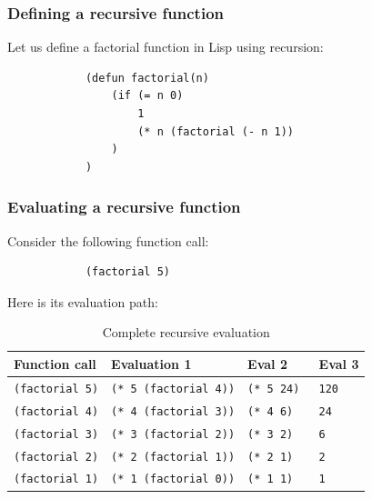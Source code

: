 \documentclass{beamer}
\begin{document}
\begin{frame}[fragile]
	\frametitle{Defining a recursive function}
		Let us define a factorial function in Lisp using recursion:
		\begin{example}
			\begin{verbatim}
			(defun factorial(n)
				(if (= n 0)
					1
					(* n (factorial (- n 1))
				)
			)
			\end{verbatim}
		\end{example}
		
\end{frame}

\begin{frame}[fragile]
	\frametitle{Evaluating a recursive function}
	\begin{table}
		Consider the following function call:
		\begin{example}
			\begin{verbatim}
			(factorial 5)
			\end{verbatim}
		\end{example}
		
		Here is its evaluation path:
		\begin{tabular}{l l l l}
			\toprule
			\textbf{Function call} & \textbf{Evaluation 1} & \textbf{Eval 2} & \textbf{Eval 3}\\
			\midrule
			\texttt{(factorial 5)} &\texttt{(* 5 (factorial 4))} & \texttt{(* 5 24) } & \texttt{120} \\
			\texttt{(factorial 4)} &\texttt{(* 4 (factorial 3))} & \texttt{(* 4 6)  } & \texttt{24} \\
			\texttt{(factorial 3)} &\texttt{(* 3 (factorial 2))} & \texttt{(* 3 2)  } & \texttt{6} \\
			\texttt{(factorial 2)} &\texttt{(* 2 (factorial 1))} & \texttt{(* 2 1)  } & \texttt{2} \\
			\texttt{(factorial 1)} &\texttt{(* 1 (factorial 0))} & \texttt{(* 1 1)  } & \texttt{1} \\
			\bottomrule
		\end{tabular}
		\caption{Complete recursive evaluation}
	\end{table}
\end{frame}
\end{document}
